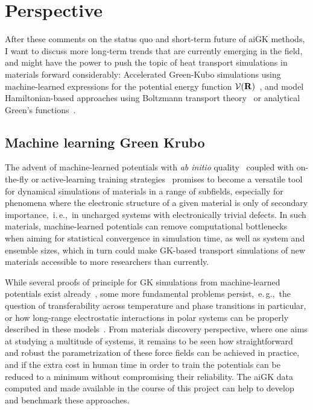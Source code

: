 \section{Perspective}
After these comments on the status quo and short-term future of aiGK methods, I want to discuss more long-term trends that are currently emerging in the field, and might have the power to push the topic of heat transport simulations in materials forward considerably:
Accelerated Green-Kubo simulations using machine-learned expressions for the potential energy function $\mathcal{V} ({\bf R})$~\cite{Korotaev2019,Li2020,Mangold2020}, and model Hamiltonian-based approaches using Boltzmann transport theory~\cite{Simoncelli2019} or analytical Green's functions~\cite{Isaeva2019,dangic2021}.

\subsection{Machine learning Green Krubo}
\label{sec:outlook.ml}
The advent of machine-learned potentials with \emph{ab initio} quality~\cite{Lorenz2004,Behler2007,Bartok2010,Bartok2013,shapeev2016} coupled with on-the-fly or active-learning training strategies~\cite{Li2015,Jinnouchi2019,podryabinkin2017,Liu2021} promises to become a versatile tool for dynamical simulations of materials in a range of subfields, especially for phenomena where the electronic structure of a given material is only of secondary importance,~i.\,e.,~in uncharged systems with electronically trivial defects. In such materials, machine-learned potentials can remove computational bottlenecks when aiming for statistical convergence in simulation time, as well as system and ensemble sizes, which in turn could make GK-based transport simulations of new materials accessible to more researchers than currently.

While several proofs of principle for GK simulations from machine-learned potentials exist already~\cite{Korotaev2019,Li2020,Mangold2020}, some more fundamental problems persist,~e.\,g.,~the question of transferability across temperature and phase transitions in particular, or how long-range electrostatic interactions in polar systems can be properly described in these models~\cite{Artrith2011,Grisafi2019,yue2021,kovacs2021}. From materials discovery perspective, where one aims at studying a multitude of systems, it remains to be seen how straightforward and robust the parametrization of these force fields can be achieved in practice, and if the extra cost in human time in order to train the potentials can be reduced to a minimum without compromising their reliability. The aiGK data computed and made available in the course of this project can help to develop and benchmark these approaches.


